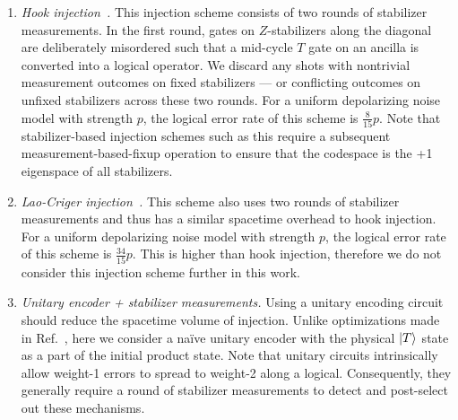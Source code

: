 \documentclass[%
    aps, 
    physrev,
    reprint,
]{revtex4-2}
\begin{document}
\begin{enumerate}

    \item \textit{Hook injection~\cite{gidney2023cleaner,singh2022high}.} 
    This injection scheme consists of two rounds of stabilizer measurements. 
    In the first round, gates on $Z$-stabilizers along the diagonal are deliberately misordered such that a mid-cycle $T$ gate on an ancilla is converted into a logical operator. 
    We discard any shots with nontrivial measurement outcomes on fixed stabilizers --- or conflicting outcomes on unfixed stabilizers across these two rounds.
    For a uniform depolarizing noise model with strength $p$, the logical error rate of this scheme is $\frac{8}{15} p$. 
    Note that stabilizer-based injection schemes such as this require a subsequent measurement-based-fixup operation to ensure that the codespace is the +1 eigenspace of all stabilizers.
    
    \item \textit{Lao-Criger injection~\cite{lao2022magic}.} 
    This scheme also uses two rounds of stabilizer measurements and thus has a similar spacetime overhead to hook injection.
    For a uniform depolarizing noise model with strength $p$, the logical error rate of this scheme is $\frac{34}{15} p$. 
    This is higher than hook injection, therefore we do not consider this injection scheme further in this work.
    
    \item \textit{Unitary encoder + stabilizer measurements.} 
    Using a unitary encoding circuit should reduce the spacetime volume of injection.  
    Unlike optimizations made in Ref.~\cite{gidney2024magic}, here we consider a na\"ive unitary encoder with the physical $\ket{T}$ state as a part of the initial product state. 
    Note that unitary circuits intrinsically allow weight-1 errors to spread to weight-2 along a logical. 
    Consequently, they generally require a round of stabilizer measurements to detect and post-select out these mechanisms.
    

\end{enumerate}
\end{document}
